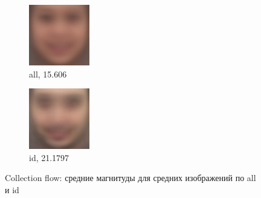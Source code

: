 \begin{figure}[t]
\centering
	\begin{subfigure}[t]{0.3\textwidth}
		\includegraphics[width=\textwidth]{results/all_no_mean.png}
		\caption{all, 15.606}
	\end{subfigure}
	\begin{subfigure}[t]{0.3\textwidth}
		\includegraphics[width=\textwidth]{results/id2_no_mean.png}
		\caption{id, 21.1797}
	\end{subfigure}
	\caption{Collection flow: средние магнитуды для средних изображений по all и id}
	\label{fig:exp_no}
\end{figure}


